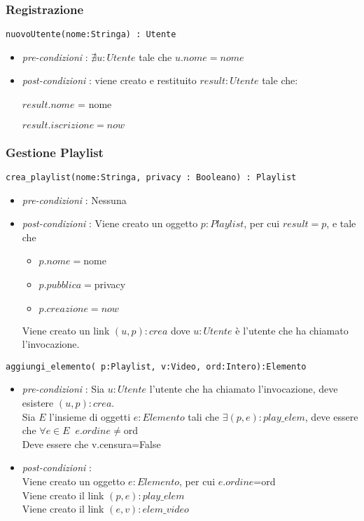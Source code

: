\documentclass[12pt, letterpaper]{article}
\newcommand{\code}[1]{\colorbox{light-gray}{\texttt{#1}}}
\newcommand{\id}{{\hphantom{ident}}}
\begin{document}
\subsubsection{Registrazione}
\code{nuovoUtente(nome:Stringa) : Utente}\begin{itemize}
    \item \textit{pre-condizioni} : $\nexists u:Utente$ tale che $u.nome = nome$
    \item \textit{post-condizioni} :
          viene creato e restituito $result:Utente$ tale che:

          $result.nome$ = nome

          $result.iscrizione=now$
\end{itemize}
\subsubsection{Gestione Playlist}
\code{crea\_playlist(nome:Stringa, privacy : Booleano) : Playlist}\begin{itemize}
    \item \textit{pre-condizioni} : Nessuna
    \item \textit{post-condizioni} : Viene creato un oggetto $p:Playlist$, per cui $result=p$,
          e tale che \begin{itemize}
              \item $p.nome=$nome
              \item $p.pubblica=$privacy
              \item $p.creazione=now$
          \end{itemize}
          Viene creato un link $(u,p):crea$ dove $u:Utente$ è l'utente che ha chiamato l'invocazione.
\end{itemize}
\code{aggiungi\_elemento( p:Playlist, v:Video, ord:Intero):Elemento}\begin{itemize}
    \item \textit{pre-condizioni} : Sia $u:Utente$ l'utente che ha chiamato l'invocazione,
          deve esistere $(u,p):crea$. \\
          Sia $E$ l'insieme di oggetti $e:Elemento$ tali che $\exists (p,e):play\_elem$, deve
          essere che $\forall e\in E\;\;e.ordine\ne$ord \\
          Deve essere che v.censura=False
    \item \textit{post-condizioni} : \\\id Viene creato un oggetto $e:Elemento$, per cui $e.ordine$=ord\\
          \id Viene creato il link $(p,e):play\_elem$ \\
          \id Viene creato il link $(e,v):elem\_video$
\end{itemize}
\end{document}
